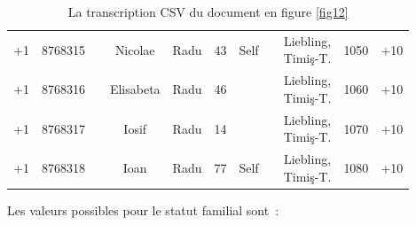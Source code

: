 \documentclass[a4paper,12pt,twoside]{book}
\begin{document}
\begin{savenotes}
\begin{table}[ht]
\begin{adjustbox}{width=1.1\textwidth,center=\textwidth}
\begin{tabular}{c|c|c|c|c|c|c|c|c|c|c}
\cline{2-10}
+1 & 8768315 &  & Nicolae & Radu & 43 & Self &  & \Centerstack{Liebling,\\Timiş-T.} & 1050 & +10\\
\cline{2-10}
+1 & 8768316 &  & Elisabeta & Radu & 46 &  &  & \Centerstack{Liebling,\\Timiş-T.} & 1060 & +10\\
\cline{2-10}
+1 & 8768317 &  & Iosif & Radu & 14 &  &  & \Centerstack{Liebling,\\Timiş-T.} & 1070 & +10\\
\cline{2-10}
+1 & 8768318 &  & Ioan & Radu & 77 & Self &  & \Centerstack{Liebling,\\Timiş-T.} & 1080 & +10\\
\cline{2-10}
                        \end{tabular}
                    \end{adjustbox}
                \caption{La transcription CSV du document en figure \ref{fig12}}\label{tab5}
                \end{table}
                \end{savenotes}
                
                \pagebreak
                Les valeurs possibles pour le statut familial sont~:
                
\end{document}
